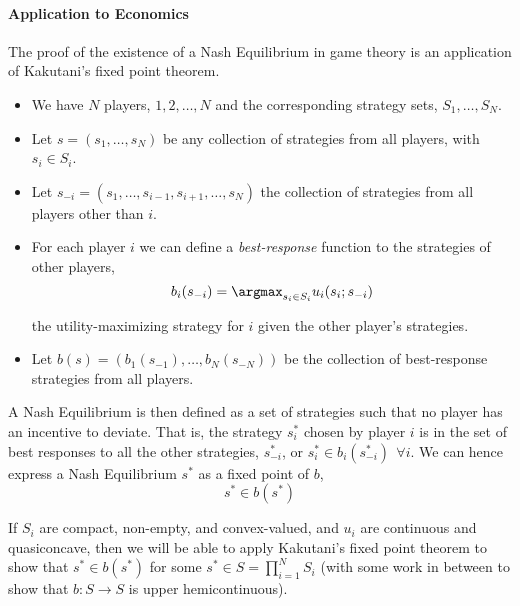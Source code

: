 \documentclass{article}
\begin{document}
\paragraph{Application to Economics}
\label{par:application_to_economics}

The proof of the existence of a Nash Equilibrium in game theory is an application of Kakutani's fixed point theorem.
\begin{itemize}[label=$\bullet$]
  \item We have $N$ players, $1, 2, \ldots, N$ and the corresponding strategy sets, $S_1, \ldots, S_N$.
  \item Let $s = (s_1, \ldots, s_N)$ be any collection of strategies from all players, with $s_i \in S_i$.
  \item Let $s_{-i} = (s_1, \ldots, s_{i - 1}, s_{i + 1}, \ldots, s_N)$ the collection of strategies from all players other than $i$.
  \item For each player $i$ we can define a \textit{best-response} function to the strategies of other players,
    \[
      b_i(s_{-i}) = \argmax_{s_i \in S_i} u_i(s_i; s_{-i})
    \]

    the utility-maximizing strategy for $i$ given the other player's strategies.

  \item Let $b(s) = \left(b_1(s_{-1}), \ldots, b_N(s_{-N})\right)$ be the collection of best-response strategies from all players.
\end{itemize}

A Nash Equilibrium is then defined as a set of strategies such that no player has an incentive to deviate. That is, the strategy $s^*_i$ chosen by player $i$ is in the set of best responses to all the other strategies, $s^*_{-i}$, or $s^*_i \in b_i(s^*_{-i}) ~~ \forall i$. We can hence express a Nash Equilibrium $s^*$ as a fixed point of $b$,
\[
  s^* \in b(s^*)
\]

If $S_i$ are compact, non-empty, and convex-valued, and $u_i$ are continuous and quasiconcave, then we will be able to apply Kakutani's fixed point theorem to show that $s^* \in b(s^*)$ for some $s^* \in S = \prod_{i = 1}^N S_i$ (with some work in between to show that $b: S \to S$ is upper hemicontinuous).

\clearpage

\setcounter{subsection}{0}
\renewcommand\thesubsection{\Alph{subsection}}
\titleformat{\subsection}[display]{
  \Large\bfseries
}{Appendix \thesubsection. #1}{0pt}{\vspace{-24pt}}
\renewcommand\thesubsubsection{\Alph{subsection}.\arabic{subsubsection}}
\end{document}
